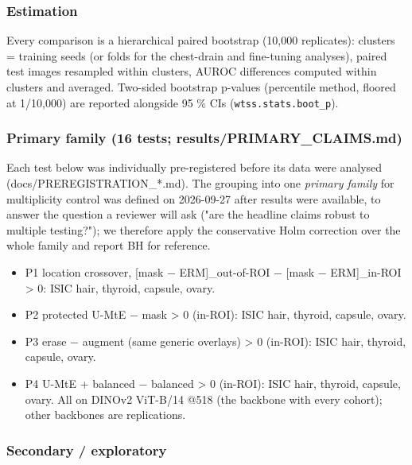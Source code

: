 {\small
\subsubsection{Estimation}\label{estimation}

Every comparison is a hierarchical paired bootstrap (10,000 replicates): clusters = training seeds (or folds for the
chest-drain and fine-tuning analyses), paired test images resampled within clusters, AUROC differences computed
within clusters and averaged. Two-sided bootstrap p-values (percentile method, floored at 1/10,000) are reported
alongside 95 \% CIs (\texttt{wtss.stats.boot\_p}).

\subsubsection{Primary family (16 tests; results/PRIMARY\_CLAIMS.md)}\label{primary-family-16-tests-resultsprimary_claimsmd}

Each test below was individually pre-registered before its data were analysed (docs/PREREGISTRATION\_*.md). The
grouping into one \emph{primary family} for multiplicity control was defined on 2026-09-27 after results were available,
to answer the question a reviewer will ask ("are the headline claims robust to multiple testing?"); we therefore
apply the conservative Holm correction over the whole family and report BH for reference.

\begin{itemize}

\item
  P1 location crossover, {[}mask − ERM{]}\_out-of-ROI − {[}mask − ERM{]}\_in-ROI \textgreater{} 0: ISIC hair, thyroid, capsule, ovary.
\item
  P2 protected U-MtE − mask \textgreater{} 0 (in-ROI): ISIC hair, thyroid, capsule, ovary.
\item
  P3 erase − augment (same generic overlays) \textgreater{} 0 (in-ROI): ISIC hair, thyroid, capsule, ovary.
\item
  P4 U-MtE + balanced − balanced \textgreater{} 0 (in-ROI): ISIC hair, thyroid, capsule, ovary.
  All on DINOv2 ViT-B/14 @518 (the backbone with every cohort); other backbones are replications.
\end{itemize}

\subsubsection{Secondary / exploratory}\label{secondary--exploratory}

}

